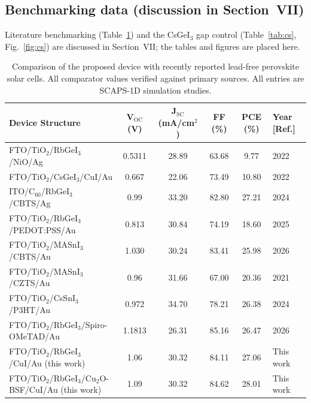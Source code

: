 \documentclass[aip,amsmath,amssymb,preprint]{revtex4-2}
\begin{document}
\subsection{Benchmarking data (discussion in Section~VII)}
Literature benchmarking (Table~\ref{tab:bench}) and the CsGeI$_{3}$ gap control (Table~\ref{tab:cs}, Fig.~\ref{fig:cs}) are discussed in Section~VII; the tables and figures are placed here.

\begin{table}[htbp]
\centering
{\scriptsize\setlength{\tabcolsep}{2pt}
\begin{tabular*}{\textwidth}{@{\extracolsep{\fill}}lccccl}
\hline
Device Structure & V$_{\mathrm{OC}}$ (V) & J$_{\mathrm{SC}}$ (mA/cm$^{2}$) & FF (\%) & PCE (\%) & Year [Ref.]
\\\hline
FTO/\allowbreak{}TiO$_{2}$/RbGeI$_{3}$/NiO/\allowbreak{}Ag & 0.5311 & 28.89 & 63.68 & 9.77 & 2022 \cite{r14}\\
FTO/\allowbreak{}TiO$_{2}$/CsGeI$_{3}$/CuI/\allowbreak{}Au & 0.667 & 22.06 & 73.49 & 10.80 & 2022 \cite{r24}\\
ITO/\allowbreak{}C$_{60}$/RbGeI$_{3}$/CBTS/\allowbreak{}Ag & 0.99 & 33.20 & 82.80 & 27.21 & 2024 \cite{r22}\\
FTO/\allowbreak{}TiO$_{2}$/RbGeI$_{3}$/PEDOT:PSS/\allowbreak{}Au & 0.813 & 30.84 & 74.19 & 18.60 & 2025 \cite{r39}\\
FTO/\allowbreak{}TiO$_{2}$/MASnI$_{3}$/CBTS/\allowbreak{}Au & 1.030 & 30.24 & 83.41 & 25.98 & 2026 \cite{r41}\\
FTO/\allowbreak{}TiO$_{2}$/MASnI$_{3}$/CZTS/Au & 0.96 & 31.66 & 67.00 & 20.36 & 2021 \cite{r42}\\
FTO/\allowbreak{}TiO$_{2}$/CsSnI$_{3}$/P3HT/Au & 0.972 & 34.70 & 78.21 & 26.38 & 2024 \cite{r40}\\
FTO/\allowbreak{}TiO$_{2}$/RbGeI$_{3}$/Spiro-OMeTAD/\allowbreak{}Au & 1.1813 & 26.31 & 85.16 & 26.47 & 2026 \cite{r23}\\
FTO/\allowbreak{}TiO$_{2}$/RbGeI$_{3}$/CuI/\allowbreak{}Au (this work) & 1.06 & 30.32 & 84.11 & 27.06 & This work\\
FTO/\allowbreak{}TiO$_{2}$/RbGeI$_{3}$/Cu$_{2}$O-BSF/CuI/\allowbreak{}Au (this work) & 1.09 & 30.32 & 84.62 & 28.01 & This work\\
\hline
\end{tabular*}
}
\caption{Comparison of the proposed device with recently reported lead-free perovskite solar cells. All comparator values verified against primary sources. All entries are SCAPS-1D simulation studies.}
\label{tab:bench}
\end{table}
\end{document}
